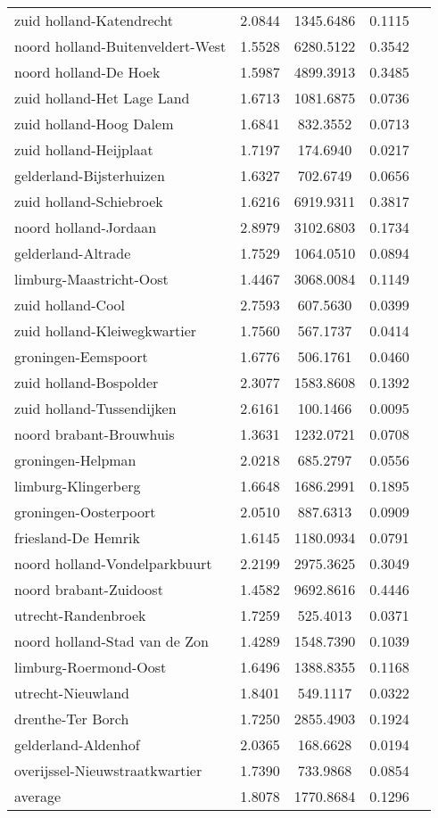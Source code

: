 \begin{longtable}{llccc}
zuid holland-Katendrecht & 2.0844 & 1345.6486 & 0.1115 \\
noord holland-Buitenveldert-West & 1.5528 & 6280.5122 & 0.3542 \\
noord holland-De Hoek & 1.5987 & 4899.3913 & 0.3485 \\
zuid holland-Het Lage Land & 1.6713 & 1081.6875 & 0.0736 \\
zuid holland-Hoog Dalem & 1.6841 & 832.3552 & 0.0713 \\
zuid holland-Heijplaat & 1.7197 & 174.6940 & 0.0217 \\
gelderland-Bijsterhuizen & 1.6327 & 702.6749 & 0.0656 \\
zuid holland-Schiebroek & 1.6216 & 6919.9311 & 0.3817 \\
noord holland-Jordaan & 2.8979 & 3102.6803 & 0.1734 \\
gelderland-Altrade & 1.7529 & 1064.0510 & 0.0894 \\
limburg-Maastricht-Oost & 1.4467 & 3068.0084 & 0.1149 \\
zuid holland-Cool & 2.7593 & 607.5630 & 0.0399 \\
zuid holland-Kleiwegkwartier & 1.7560 & 567.1737 & 0.0414 \\
groningen-Eemspoort & 1.6776 & 506.1761 & 0.0460 \\
zuid holland-Bospolder & 2.3077 & 1583.8608 & 0.1392 \\
zuid holland-Tussendijken & 2.6161 & 100.1466 & 0.0095 \\
noord brabant-Brouwhuis & 1.3631 & 1232.0721 & 0.0708 \\
groningen-Helpman & 2.0218 & 685.2797 & 0.0556 \\
limburg-Klingerberg & 1.6648 & 1686.2991 & 0.1895 \\
groningen-Oosterpoort & 2.0510 & 887.6313 & 0.0909 \\
friesland-De Hemrik & 1.6145 & 1180.0934 & 0.0791 \\
noord holland-Vondelparkbuurt & 2.2199 & 2975.3625 & 0.3049 \\
noord brabant-Zuidoost & 1.4582 & 9692.8616 & 0.4446 \\
utrecht-Randenbroek & 1.7259 & 525.4013 & 0.0371 \\
noord holland-Stad van de Zon & 1.4289 & 1548.7390 & 0.1039 \\
limburg-Roermond-Oost & 1.6496 & 1388.8355 & 0.1168 \\
utrecht-Nieuwland & 1.8401 & 549.1117 & 0.0322 \\
drenthe-Ter Borch & 1.7250 & 2855.4903 & 0.1924 \\
gelderland-Aldenhof & 2.0365 & 168.6628 & 0.0194 \\
overijssel-Nieuwstraatkwartier & 1.7390 & 733.9868 & 0.0854 \\
average & 1.8078 & 1770.8684 & 0.1296 \\
\hline
\end{longtable}
